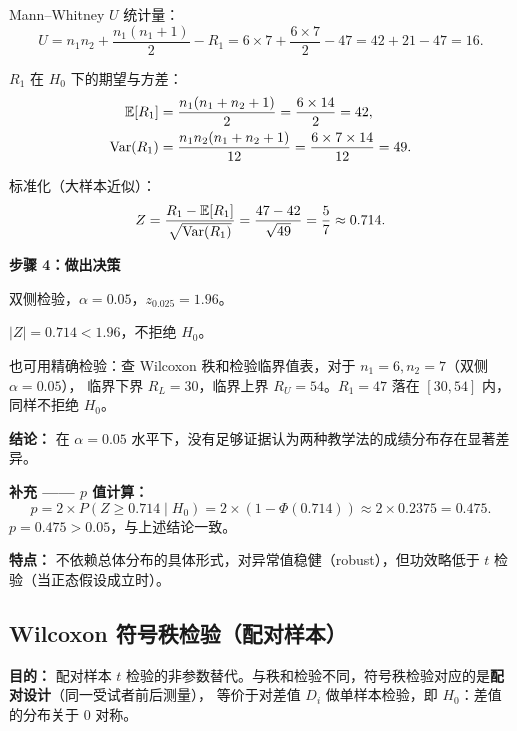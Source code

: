 \begin{example}
Mann--Whitney $U$ 统计量：
\begin{equation}
    U = n_1 n_2 + \frac{n_1(n_1+1)}{2} - R_1
      = 6 \times 7 + \frac{6 \times 7}{2} - 47
      = 42 + 21 - 47 = 16.
\end{equation}

$R_1$ 在 $H_0$ 下的期望与方差：
\begin{align}
    \mathbb{E}[R_1] &= \frac{n_1(n_1+n_2+1)}{2}
             = \frac{6 \times 14}{2} = 42, \\
    \mathrm{Var}(R_1) &= \frac{n_1 n_2 (n_1+n_2+1)}{12}
               = \frac{6 \times 7 \times 14}{12} = 49.
\end{align}

标准化（大样本近似）：
\begin{equation}
    Z = \frac{R_1 - \mathbb{E}[R_1]}{\sqrt{\mathrm{Var}(R_1)}}
      = \frac{47 - 42}{\sqrt{49}}
      = \frac{5}{7} \approx 0.714.
\end{equation}

\textbf{步骤 4：做出决策}

双侧检验，$\alpha = 0.05$，$z_{0.025} = 1.96$。

$|Z| = 0.714 < 1.96$，不拒绝 $H_0$。

也可用精确检验：查 Wilcoxon 秩和检验临界值表，对于 $n_1=6, n_2=7$（双侧 $\alpha=0.05$），
临界下界 $R_L = 30$，临界上界 $R_U = 54$。$R_1 = 47$ 落在 $[30, 54]$ 内，同样不拒绝 $H_0$。

\textbf{结论：} 在 $\alpha = 0.05$ 水平下，没有足够证据认为两种教学法的成绩分布存在显著差异。

\textbf{补充 —— $p$ 值计算：}
\begin{equation}
    p = 2 \times P(Z \ge 0.714 \mid H_0)
      = 2 \times (1 - \Phi(0.714))
      \approx 2 \times 0.2375 = 0.475.
\end{equation}
$p = 0.475 > 0.05$，与上述结论一致。
\end{example}

\textbf{特点：} 不依赖总体分布的具体形式，对异常值稳健（robust），但功效略低于 $t$ 检验（当正态假设成立时）。

\subsection{Wilcoxon 符号秩检验（配对样本）}

\textbf{目的：} 配对样本 $t$ 检验的非参数替代。与秩和检验不同，符号秩检验对应的是\textbf{配对设计}（同一受试者前后测量），
等价于对差值 $D_i$ 做单样本检验，即 $H_0$：差值的分布关于 0 对称。

